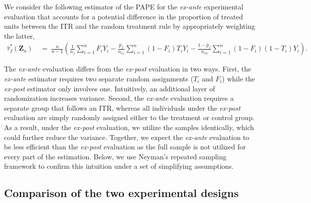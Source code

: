 \documentclass[USenglish,onecolumn]{article}
\renewcommand\r{\right}
\renewcommand\l{\left}
\newcommand\bZ{\bm{Z}}
\begin{document}
We consider the following estimator of the PAPE for the
\textit{ex-ante} experimental evaluation that accounts for a potential
difference in the proportion of treated units between the ITR and the
random treatment rule by appropriately weighting the latter,
\begin{align}
	\hat\tau_f^\ast(\bZ_n) \ &= \ \frac{n}{n-1} \l(\frac{1}{n_f}  \sum_{i=1}^n
	F_i Y_i - \frac{\hat{p}_f}{n_{r1}} \sum_{i=1}^n (1-F_i)T_i Y_i -
	\frac{1-\hat{p}_f}{n_{r0}} \sum_{i=1}^n (1-F_i)(1-T_i) Y_i  \r). \label{eq:PAPEaest}
\end{align}

The \textit{ex-ante} evaluation differs from the \textit{ex-post}
evaluation in two ways. First, the \textit{ex-ante} estimator requires
two separate random assignments ($T_i$ and $F_i$) while the
\textit{ex-post} estimator only involves one.  Intuitively, an
additional layer of randomization increases variance. Second, the
\textit{ex-ante} evaluation requires a separate group that follows an
ITR, whereas all individuals under the \textit{ex-post} evaluation are
simply randomly assigned either to the treatment or control group.  As
a result, under the \textit{ex-post} evaluation, we utilize the
samples identically, which could further reduce the variance.
Together, we expect the \textit{ex-ante} evaluation to be less
efficient than the \textit{ex-post} evaluation as the full sample is
not utilized for every part of the estimation.  Below, we use Neyman's
repeated sampling framework to confirm this intuition under a set of
simplifying assumptions.

\subsection{Comparison of the two experimental designs}
\label{subsec:comparison}
\end{document}
